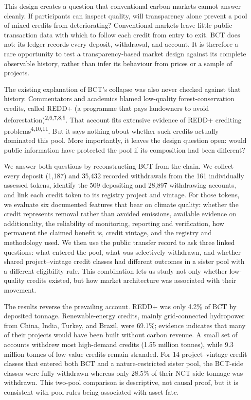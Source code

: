 \documentclass[sn-nature,Numbered]{sn-jnl}
\begin{document}
This design creates a question that conventional carbon markets cannot answer cleanly. If participants can inspect quality, will transparency alone prevent a pool of mixed credits from deteriorating? Conventional markets leave little public transaction data with which to follow each credit from entry to exit. BCT does not: its ledger records every deposit, withdrawal, and account. It is therefore a rare opportunity to test a transparency-based market design against its complete observable history, rather than infer its behaviour from prices or a sample of projects.

The existing explanation of BCT's collapse was also never checked against that history. Commentators and academics blamed low-quality forest-conservation credits, called REDD+ (a programme that pays landowners to avoid deforestation)\textsuperscript{2,6,7,8,9}. That account fits extensive evidence of REDD+ crediting problems\textsuperscript{4,10,11}. But it says nothing about whether such credits actually dominated this pool. More importantly, it leaves the design question open: would public information have protected the pool if its composition had been different?

We answer both questions by reconstructing BCT from the chain. We collect every deposit (1,187) and 35,432 recorded withdrawals from the 161 individually assessed tokens, identify the 509 depositing and 28,897 withdrawing accounts, and link each credit token to its registry project and vintage. For those tokens, we evaluate six documented features that bear on climate quality: whether the credit represents removal rather than avoided emissions, available evidence on additionality, the reliability of monitoring, reporting and verification, how permanent the claimed benefit is, credit vintage, and the registry and methodology used. We then use the public transfer record to ask three linked questions: what entered the pool, what was selectively withdrawn, and whether shared project--vintage credit classes had different outcomes in a sister pool with a different eligibility rule. This combination lets us study not only whether low-quality credits existed, but how market architecture was associated with their movement.

The results reverse the prevailing account. REDD+ was only 4.2\% of BCT by deposited tonnage. Renewable-energy credits, mainly grid-connected hydropower from China, India, Turkey, and Brazil, were 69.1\%; evidence indicates that many of their projects would have been built without carbon revenue. A small set of accounts withdrew most high-demand credits (1.55 million tonnes), while 9.3 million tonnes of low-value credits remain stranded. For 14 project--vintage credit classes that entered both BCT and a nature-restricted sister pool, the BCT-side classes were fully withdrawn whereas only 28.5\% of their NCT-side tonnage was withdrawn. This two-pool comparison is descriptive, not causal proof, but it is consistent with pool rules being associated with asset fate.
\end{document}
